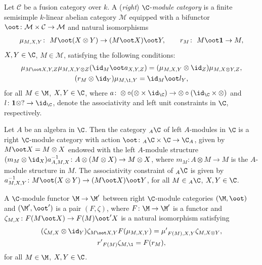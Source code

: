 \subsection{}
Let $\mathcal{C}$ be a fusion category over $k$. A (\emph{right}) $\C$-\emph{module category} is a f\/inite semisimple $k$-linear abelian category $\mathcal{M}$ equipped with a bifunctor $\oot\colon \mathcal{M}\times \mathcal{C} \rightarrow\mathcal{M}$ and natural isomorphisms
\begin{gather*}\mu_{M, X,Y}\colon \ M \oot (X\otimes Y)\rightarrow (M\oot X)\oot Y,\qquad r_M\colon \ M \oot \textbf{1}\rightarrow M, \end{gather*}
$X, Y \in \C$, $M \in \mathcal M$, satisfying the following conditions:
\begin{gather} \label{modcat1} \mu_{M\oot X, Y, Z} \mu_{M, X, Y \otimes Z} ( \id_M \oot a_{X, Y, Z} ) =
 (\mu_{M, X, Y} \otimes \id_Z ) \mu_{M, X\otimes Y, Z},\\
 \label{modcat2} (r_M \otimes \id_Y ) \mu_{M, \1, Y} = \id_M \oot l_Y,
\end{gather}
for all $M \in \M$, $X, Y \in \C$, where $a\colon \otimes \circ (\otimes \times \id_\C) \to \otimes \circ (\id_\C \times \otimes)$ and $l\colon \textbf{1} \otimes ? \to \id_\C$, denote the associativity and left unit constraints in $\C$, respectively.

Let $A$ be an algebra in $\C$. Then the category $_A\C$ of left $A$-modules in $\C$ is a right $\C$-module category with action $\oot\colon _A\C \times \C \to \C_A$, given by $M\oot X = M\otimes X$ endowed with the left $A$-module structure $(m_M \otimes \id_X) a_{A, M, X}^{-1}\colon A\otimes (M\otimes X) \to M\otimes X$, where $m_M\colon A\otimes M \to M$ is the $A$-module structure in $M$. The associativity constraint of $_A\C$ is given by $a^{-1}_{M, X, Y}\colon M\oot (X \otimes Y) \to (M\oot X) \oot Y$, for all $M \in {} _A\C$, $X, Y \in \C$.

A $\C$-module functor $\M \to \M'$ between right $\C$-module categories $(\M, \oot)$ and $(\M', \oot')$ is a pair $(F, \zeta)$, where $F\colon \M\to \M'$ is a functor and $\zeta_{M, X}\colon F(M \oot X) \to F(M) \oot' X$ is a natural isomorphism satisfying
\begin{gather}\label{uno-z} (\zeta_{M, X} \otimes \id_Y ) \zeta_{M \oot X, Y} F(\mu_{M, X, Y}) = {\mu'}_{F(M), X, Y} \zeta_{M, X \otimes Y},\\
\label{dos-z} {r'}_{F(M)} \zeta_{M, \1} = F(r_M),
\end{gather}
for all $M \in \M$, $X, Y \in \C$.

